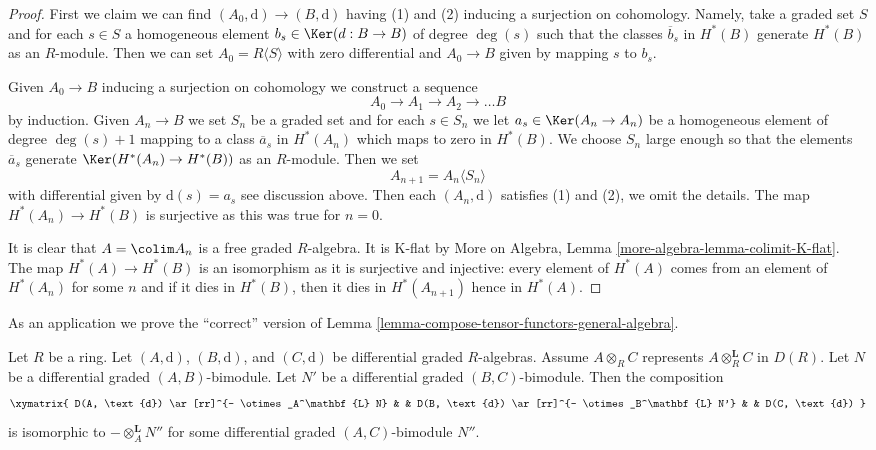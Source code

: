 \begin{proof}
First we claim we can find $(A_0, \text{d}) \to (B, \text{d})$
having (1) and (2) inducing a surjection on cohomology.
Namely, take a graded set $S$ and for each $s \in S$
a homogeneous element $b_s \in \Ker(d : B \to B)$ of degree $\deg(s)$
such that the classes $\overline{b}_s$ in $H^*(B)$
generate $H^*(B)$ as an $R$-module.
Then we can set $A_0 = R\langle S \rangle$ with zero differential
and $A_0 \to B$ given by mapping $s$ to $b_s$.

\medskip\noindent
Given $A_0 \to B$ inducing a surjection on cohomology we construct
a sequence
$$
A_0 \to A_1 \to A_2 \to \ldots B
$$
by induction. Given $A_n \to B$ we set $S_n$ be a graded set
and for each $s \in S_n$ we let $a_s \in \Ker(A_n \to A_n)$
be a homogeneous element of degree $\deg(s) + 1$
mapping to a class $\overline{a}_s$ in $H^*(A_n)$
which maps to zero in $H^*(B)$. We choose $S_n$ large enough
so that the elements $\overline{a}_s$ generate $\Ker(H^*(A_n) \to H^*(B))$
as an $R$-module. Then we set
$$
A_{n + 1} = A_n\langle S_n \rangle
$$
with differential given by $\text{d}(s) = a_s$ see discussion above.
Then each $(A_n, \text{d})$ satisfies (1) and (2), we omit the details.
The map $H^*(A_n) \to H^*(B)$ is surjective as this was true for $n = 0$.

\medskip\noindent
It is clear that $A = \colim A_n$ is a free graded $R$-algebra.
It is K-flat by More on Algebra, Lemma \ref{more-algebra-lemma-colimit-K-flat}.
The map $H^*(A) \to H^*(B)$ is an isomorphism as it is surjective
and injective: every element of $H^*(A)$ comes from an element of
$H^*(A_n)$ for some $n$ and if it dies in $H^*(B)$, then it dies
in $H^*(A_{n + 1})$ hence in $H^*(A)$.
\end{proof}

\noindent
As an application we prove the ``correct'' version of
Lemma \ref{lemma-compose-tensor-functors-general-algebra}.

\begin{lemma}
\label{lemma-compose-tensor-functors-tor}
Let $R$ be a ring. Let $(A, \text{d})$, $(B, \text{d})$, and
$(C, \text{d})$ be differential graded $R$-algebras. Assume
$A \otimes_R C$ represents $A \otimes^\mathbf{L}_R C$ in $D(R)$.
Let $N$ be a differential graded $(A, B)$-bimodule.
Let $N'$ be a differential graded $(B, C)$-bimodule.
Then the composition
$$
\xymatrix{
D(A, \text{d}) \ar[rr]^{- \otimes_A^\mathbf{L} N} & &
D(B, \text{d}) \ar[rr]^{- \otimes_B^\mathbf{L} N'} & &
D(C, \text{d})
}
$$
is isomorphic to $- \otimes_A^\mathbf{L} N''$ for some differential graded
$(A, C)$-bimodule $N''$.
\end{lemma}

